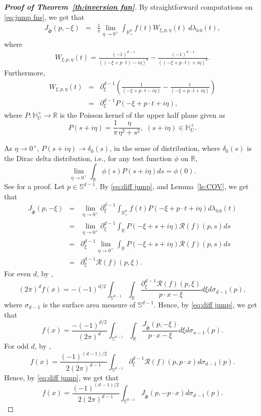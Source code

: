 \documentclass[11pt,reqno]{amsart}
\theoremstyle{plain}
\theoremstyle{definition}
\numberwithin{equation}{section}
\newcommand{\R}{\mathbb{R}}
\newcommand{\ltt}{\left(}
\newcommand{\rtt}{\right)}
\newcommand{\beas}{\begin{eqnarray*}}
\newcommand{\eeas}{\end{eqnarray*}}
\newcommand{\bea} {\begin{eqnarray}}
\newcommand{\eea} {\end{eqnarray}}
\begin{document}
	\begin{proof}[\textbf{Proof of Theorem~\ref{th:inversion fan}}]
		By straightforward computations on  \eqref{eq:jump fns}, we get that
		\bea
		\label{eq:diff jump}J_{\widetilde{\Phi}}(p,-\xi)&=&\frac{1}{\pi}\lim\limits_{\eta\rightarrow 0^+} \int_{\R^d_+} f(t) W_{\xi,p,\eta}(t) \ d\lambda_{leb}(t),
		\eea
		where 
		\beas\label{eq:jump kernel}
		W_{\xi,p,\eta}(t)=\frac{(-1)^{d-1}}{((-\xi+p\cdot t)-i\eta)^{d}}-\frac{(-1)^{d-1}}{((-\xi+p\cdot t)+i\eta)^{d}}.
		\eeas
	Furthermore,
	\beas
	W_{\xi,p,\eta}(t)&=& {\partial^{d-1}_\xi} \ltt\frac{1}{(-\xi+p\cdot t-i\eta)}-\frac{1}{(-\xi+p\cdot t+i\eta)}\rtt\\
	&=& {\partial^{d-1}_\xi} P(-\xi+p\cdot t+i\eta),
	\eeas
	where $P: \mathbb{H}_U^+\rightarrow \R$ is the Poisson kernel of the upper half plane given as
	$$P(s+i\eta)=\frac{1}{\pi} \frac{\eta}{\eta^2+s^2},\,\,(s+i\eta)\in \mathbb H^+_U.$$
	
	As $\eta\rightarrow 0^+$, $P(s+i\eta)\rightarrow\delta_0(s)$, in the sense of distribution, where $\delta_0(s)$ is the Dirac delta distribution, i.e., for any test function $\phi$ on $\R$,
	\[
	\lim_{\eta\rightarrow0^+} \int_{\R} \phi(s) P(s+i\eta) ds=\phi(0).
	\]
    See \cite[Theorem~2.1]{Stein-Weiss} for a proof. 
	Let $p\in \mathbb S^{d-1}$.
	By \eqref{eq:diff jump}, and Lemma~\ref{le:COV}, we get that 
	\beas
	J_{\widetilde{\Phi}}(p,-\xi)
	&=&\lim_{\eta\rightarrow 0^+}\partial^{d-1}_\xi\int_{\R^d_+} f(t) P(-\xi+p\cdot t+i\eta) d\lambda_{leb}(t)\\
	&=&\lim_{\eta\rightarrow 0^+}\partial^{d-1}_\xi\int_\R P(-\xi+s+i\eta) \mathcal R(f)(p,s) ds\\
	&=& \partial^{d-1}_\xi \lim_{\eta\rightarrow 0^+} \int_\R P(-\xi+s+i\eta) \mathcal R(f)(p,s) ds\\
	&=&\partial^{d-1}_\xi \mathcal R(f)(p,\xi). 
	\eeas
	For even $d$, by 
	\cite[Section ~2.3]{Palamadov-book},
	\[
	(2\pi)^d f(x)=-(-1)^{d/2} \int_{\mathbb S^{d-1}}\int_\R \frac{{\partial^{d-1}_\xi} \mathcal R(f)(p,\xi)}{p\cdot x-\xi} d\xi d\sigma_{d-1}(p),
	\]
	where $\sigma_{d-1}$ is the surface area measure of $\mathbb S^{d-1}$.
	Hence, by \eqref{eq:diff jump}, we get that
	\[
	f(x)= \frac{-(-1)^{d/2}}{(2\pi)^d}\int_{\mathbb S^{d-1}}{\int_\R}\frac{ J_{\widetilde{\Phi}}(p,-\xi)}{p\cdot x-\xi} d\xi d\sigma_{n-1}(p).
	\]
	For odd $d$,  by
	\cite[Corollary~2.6]{Palamadov-book},
	\[
	f(x)=\frac{(-1)^{(d-1)/2}}{2(2\pi)^{d-1}} \int_{\mathbb S^{d-1}}\partial^{d-1}_\xi \mathcal R(f)(p,p\cdot x) d\sigma_{d-1}(p).
	\]
	Hence, by \eqref{eq:diff jump}, we get that
	\[
	f(x)=\frac{(-1)^{(d-1)/2}}{2(2\pi)^{d-1}} \int_{\mathbb S^{d-1}} J_{\widetilde{\Phi}}(p,-p\cdot x) d\sigma_{d-1}(p).
	\]
\end{proof}
\end{document}
